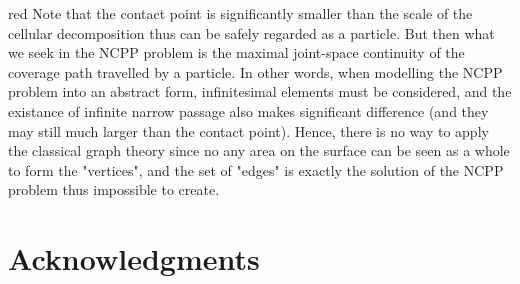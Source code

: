 \documentclass[conference]{IEEEtran}
\begin{document}
\begin{color}{red}
Note that the contact point is significantly smaller than the scale of the cellular decomposition thus can be safely regarded as a particle. But then what we seek in the NCPP problem is the maximal joint-space continuity of the coverage path travelled by a particle. In other words, when modelling the NCPP problem into an abstract form, infinitesimal elements must be considered, and the existance of infinite narrow passage also makes significant difference (and they may still much larger than the contact point). 
Hence, there is no way to apply the classical graph theory since no any area on the surface can be seen as a whole to form the "vertices", and the set of "edges" is exactly the solution of the NCPP problem thus impossible to create. 
\end{color}

%



\section*{Acknowledgments}




\end{document}
